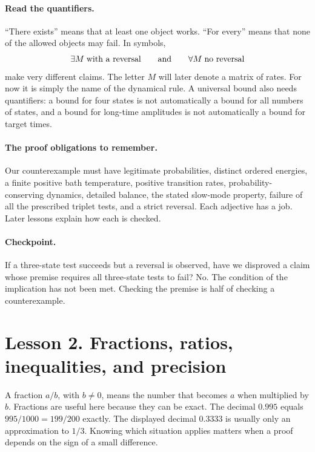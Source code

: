 \documentclass[11pt]{article}
\begin{document}
\paragraph{Read the quantifiers.}
``There exists'' means that at least one object works. ``For every'' means that
none of the allowed objects may fail. In symbols,
\[
\exists M\;\text{with a reversal}
\qquad\hbox{and}\qquad
\forall M\;\text{no reversal}
\]
make very different claims. The letter $M$ will later denote a matrix of rates.
For now it is simply the name of the dynamical rule. A universal bound also
needs quantifiers: a bound for four states is not automatically a bound for all
numbers of states, and a bound for long-time amplitudes is not automatically a
bound for target times.

\paragraph{The proof obligations to remember.}
Our counterexample must have legitimate probabilities, distinct ordered
energies, a finite positive bath temperature, positive transition rates,
probability-conserving dynamics, detailed balance, the stated slow-mode
property, failure of all the prescribed triplet tests, and a strict reversal.
Each adjective has a job. Later lessons explain how each is checked.

\paragraph{Checkpoint.}
If a three-state test succeeds but a reversal is observed, have we disproved a
claim whose premise requires all three-state tests to fail? No. The condition
of the implication has not been met. Checking the premise is half of checking
a counterexample.

\clearpage
\section*{Lesson 2. Fractions, ratios, inequalities, and precision}
A fraction $a/b$, with $b\ne0$, means the number that becomes $a$ when multiplied
by $b$. Fractions are useful here because they can be exact. The decimal
$0.995$ equals $995/1000=199/200$ exactly. The displayed decimal $0.3333$ is
usually only an approximation to $1/3$. Knowing which situation applies matters
when a proof depends on the sign of a small difference.
\end{document}
